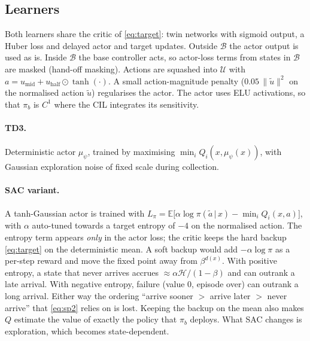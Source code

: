 \documentclass[11pt,a4paper]{article}
\newcommand{\B}{\mathcal{B}}
\newcommand{\U}{\mathcal{U}}
\begin{document}
\begin{table}[t]
\centering\small
\caption{Design region, curriculum mixture and reference measure.}
\label{tab:region}

\end{table}

\subsection{Learners}
Both learners share the critic of \eqref{eq:target}: twin networks with sigmoid output, a Huber loss and
delayed actor and target updates. Outside $\B$ the actor output is used as is. Inside $\B$ the base controller
acts, so actor-loss terms from states in $\B$ are masked (hand-off masking). Actions are squashed into
$\U$ with $a=u_{\mathrm{mid}}+u_{\mathrm{half}}\odot\tanh(\cdot)$. A small action-magnitude penalty
($0.05\,\|\tilde u\|^2$ on the normalised action $\tilde u$) regularises the actor. The actor uses ELU
activations, so that $\pi_b$ is $C^1$ where the CIL integrates its sensitivity.

\paragraph{TD3.} Deterministic actor $\mu_\psi$, trained by maximising $\min_iQ_i(x,\mu_\psi(x))$, with
Gaussian exploration noise of fixed scale during collection.

\paragraph{SAC variant.} A tanh-Gaussian actor is trained with
$L_\pi=\mathbb{E}\big[\alpha\log\pi(\tilde a\,|\,x)-\min_iQ_i(x,a)\big]$, with $\alpha$ auto-tuned towards a
target entropy of $-4$ on the normalised action. The entropy term appears \emph{only} in the actor loss;
the critic keeps the hard backup \eqref{eq:target} on the deterministic mean. A soft backup would add
$-\alpha\log\pi$ as a per-step reward and move the fixed point away from $\beta^{d(x)}$. With positive
entropy, a state that never arrives accrues $\approx\alpha\mathcal{H}/(1-\beta)$ and can outrank a late
arrival. With negative entropy, failure (value 0, episode over) can outrank a long arrival. Either way the
ordering ``arrive sooner $>$ arrive later $>$ never arrive'' that \eqref{eq:sp2} relies on is lost. Keeping
the backup on the mean also makes $Q$ estimate the value of exactly the policy that $\pi_b$ deploys. What
SAC changes is exploration, which becomes state-dependent.
\end{document}
